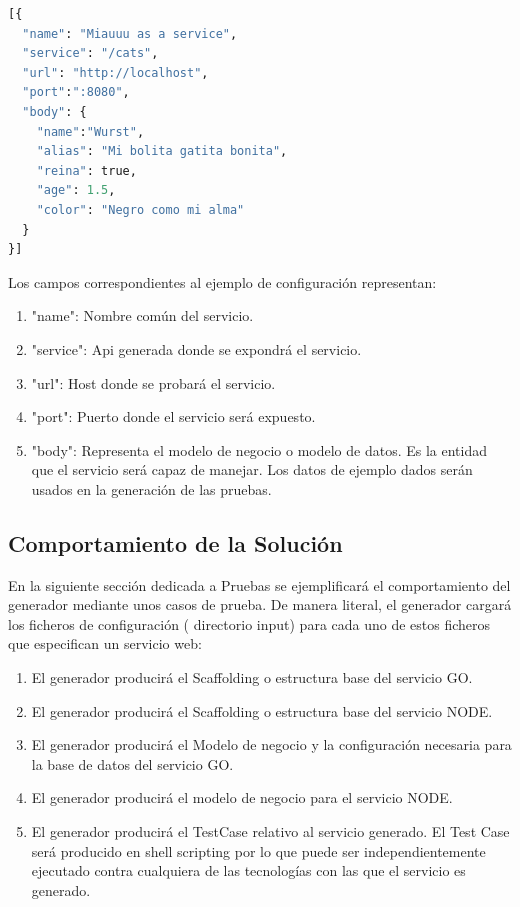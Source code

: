 \documentclass[a4paper,11pt]{book}
\begin{document}
\begin{lstlisting}[language=python,caption={ Ejemplo Entrada Generador }]
[{
  "name": "Miauuu as a service",
  "service": "/cats",
  "url": "http://localhost",
  "port":":8080",
  "body": {
    "name":"Wurst",
    "alias": "Mi bolita gatita bonita",
    "reina": true,
    "age": 1.5,
    "color": "Negro como mi alma"
  }
}]
\end{lstlisting}


Los campos correspondientes al ejemplo de configuración representan: 

\begin{enumerate}
\item "name": Nombre común del servicio.
\item "service": Api generada donde se expondrá el servicio.
\item "url":  Host donde se probará el servicio.
\item "port": Puerto donde el servicio será expuesto.
\item "body": Representa el modelo de negocio o modelo de datos. Es la entidad que el servicio será capaz de manejar.  Los datos de ejemplo dados serán usados en la generación de las pruebas. 
\end{enumerate}

\subsection{Comportamiento de la Solución}

En la siguiente sección dedicada a Pruebas se ejemplificará el comportamiento del generador mediante unos casos de prueba. De manera literal, el generador cargará los ficheros de configuración ( directorio input) para cada uno de estos ficheros que especifican un servicio web: 

\begin{enumerate}
\item El generador producirá el Scaffolding o estructura base del servicio GO.
\item El generador producirá el Scaffolding o estructura base del servicio NODE.
\item  El generador producirá el Modelo de negocio y la configuración necesaria para la base de datos del servicio GO.
\item El generador producirá el modelo de negocio para el servicio NODE.
\item El generador producirá el TestCase relativo al servicio generado. El Test Case será producido en shell scripting por lo que puede ser independientemente ejecutado contra cualquiera de las tecnologías con las que el servicio es generado.
\end{enumerate}
\end{document}
